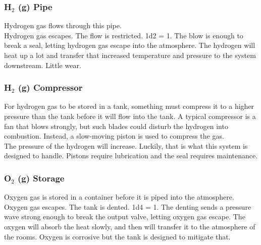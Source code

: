 \documentclass[a4paper]{article}
\begin{document}
\vspace{-0.5cm} \hspace{-18pt} \subsubsection{H$_2$ (g) Pipe} \label{life_h2_pipe} \vspace{-0.2cm}
Hydrogen gas flows through this pipe.
\\ \pbhw
{Hydrogen gas escapes.}
{The flow is restricted. \newline 1d2 = 1. The blow is enough to break a seal, letting hydrogen gas escape into the atmosphere.}
{The hydrogen will heat up a lot and transfer that increased temperature and pressure to the system downstream.}
{Little wear.}


\vspace{-0.5cm} \hspace{-18pt} \subsubsection{H$_2$ (g) Compressor} \label{life_h2_compressor} \vspace{-0.2cm}
For hydrogen gas to be stored in a tank, something must compress it to a higher pressure than the tank before it will flow into the tank. A typical compressor is a fan that blows strongly, but such blades could disturb the hydrogen into combustion. Instead, a slow-moving piston is used to compress the gas.
\\ \pbhw
{}
{}
{The pressure of the hydrogen will increase. Luckily, that is what this system is designed to handle.}
{Pistons require lubrication and the seal requires maintenance.}


\vspace{-0.5cm} \hspace{-18pt} \subsubsection{O$_2$ (g) Storage} \label{life_o2_storage} \vspace{-0.2cm}
Oxygen gas is stored in a container before it is piped into the atmosphere.
\\ \pbhw
{Oxygen gas escapes.}
{The tank is dented. \newline 1d4 = 1. The denting sends a pressure wave strong enough to break the output valve, letting oxygen gas escape.}
{The oxygen will absorb the heat slowly, and then will transfer it to the atmosphere of the rooms.}
{Oxygen is corrosive but the tank is designed to mitigate that.}
\end{document}
